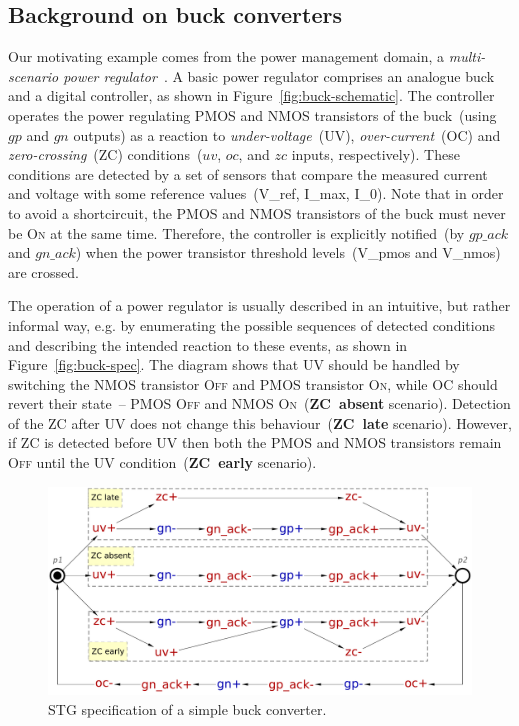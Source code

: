 \documentclass[british, journal]{IEEEtran}
\newcommand{\noun}[1]{\textsc{#1}}
\begin{document}
\subsection{Background on buck converters\label{sub:buck}}

Our motivating example comes from the power management domain, a
\emph{multi-scenario power regulator}~\cite{2014_sokolov_ftfc}.
A basic power regulator comprises an analogue buck and a digital controller,
as shown in Figure~\ref{fig:buck-schematic}. The controller operates
the power regulating PMOS and NMOS transistors of the buck~(using \textsf{$gp$}
and \textsf{$gn$} outputs) as a reaction to \emph{under-voltage}~(UV),
\emph{over-current}~(OC) and \emph{zero-crossing}~(ZC) conditions~(\textsf{$uv$},
\textsf{$oc$}, and \textsf{$zc$} inputs, respectively). These conditions
are detected by a set of sensors that compare the measured current and voltage
with some reference values~(\textsf{V\_ref}, \textsf{I\_max}, \textsf{I\_0}).
Note that in order to avoid a shortcircuit, the PMOS and NMOS transistors of
the buck must never be \noun{On} at the same time. Therefore, the controller
is explicitly notified~(by \textsf{$gp\_ack$} and \textsf{$gn\_ack$})
when the power transistor threshold levels~(\textsf{V\_pmos} and \textsf{V\_nmos})
are crossed.

The operation of a power regulator is usually described in an intuitive,
but rather informal way, e.g. by enumerating the possible sequences
of detected conditions and describing the intended reaction to these
events, as shown in Figure~\ref{fig:buck-spec}. The diagram shows
that UV should be handled by switching the NMOS transistor \noun{Off}
and PMOS transistor \noun{On}, while OC should revert their state~--
PMOS \noun{Off} and NMOS \noun{On}~(\textbf{ZC~absent} scenario). Detection of
the ZC after UV does not change this behaviour~(\textbf{ZC~late} scenario).
However, if ZC is detected before UV then both the PMOS and NMOS transistors
remain \noun{Off} until the UV condition~(\textbf{ZC~early} scenario).

\begin{figure}[t]
\begin{centering}
\includegraphics[scale=0.23]{Images/stg-buck}
\par
\protect\caption{\label{fig:Monolithic-buck}STG specification of a simple buck converter.}
\par\end{centering}
\vspace{-3mm}
\end{figure}
\end{document}
